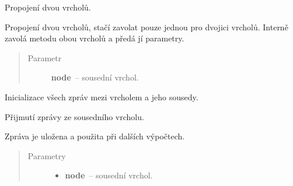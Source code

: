 \begin{fulllineitems}
\begin{fulllineitems}
\begin{quote}
\begin{description}
\end{description}\end{quote}

\end{fulllineitems}


\begin{fulllineitems}
\label{alex.infer:alex.infer.factor.alex.infer.node.DiscreteFactorNode.connect}
Propojení dvou vrcholů.

Propojení dvou vrcholů, stačí zavolat pouze jednou pro dvojici vrcholů.
Interně zavolá metodu {\hyperref[alex.infer:alex.infer.factor.alex.infer.node.DiscreteFactorNode.add_neighbor]{}} obou vrcholů a předá jí parametry.
\begin{quote}\begin{description}
\item[{Parametr}] \leavevmode
\textbf{node}~-- sousední vrchol.

\end{description}\end{quote}

\end{fulllineitems}


\begin{fulllineitems}
\label{alex.infer:alex.infer.factor.alex.infer.node.DiscreteFactorNode.init_messages}
Inicializace všech zpráv mezi vrcholem a jeho sousedy.

\end{fulllineitems}


\begin{fulllineitems}
\label{alex.infer:alex.infer.factor.alex.infer.node.DiscreteFactorNode.message_from}
Přijmutí zprávy ze sousedního vrcholu.

Zpráva je uložena a použita při dalších výpočtech.
\begin{quote}\begin{description}
\item[{Parametry}] \leavevmode\begin{itemize}
\item {} 
\textbf{node}~-- sousední vrchol.


\end{itemize}
\end{description}
\end{quote}
\end{fulllineitems}
\end{fulllineitems}
